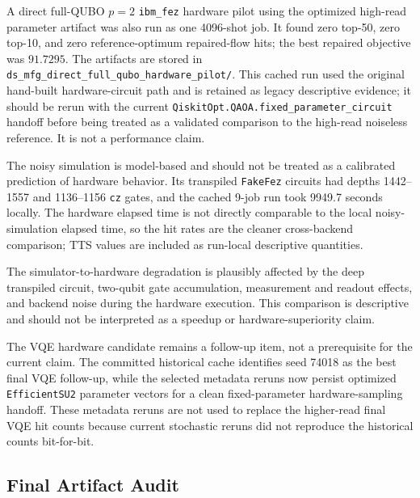 A direct full-QUBO $p=2$ \texttt{ibm\_fez} hardware pilot using the optimized
high-read parameter artifact was also run as one 4096-shot job. It found zero
top-50, zero top-10, and zero reference-optimum repaired-flow hits; the best repaired
objective was $91.7295$. The artifacts are stored in
\texttt{ds\_mfg\_direct\_full\_qubo\_hardware\_pilot/}. This cached run used
the original hand-built hardware-circuit path and is retained as legacy
descriptive evidence; it should be rerun with the current
\texttt{QiskitOpt.QAOA.fixed\_parameter\_circuit} handoff before being treated
as a validated comparison to the high-read noiseless reference. It is not a
performance claim.

The noisy simulation is model-based and should not be treated as a calibrated
prediction of hardware behavior. Its transpiled \texttt{FakeFez} circuits had
depths 1442--1557 and 1136--1156 \texttt{cz} gates, and the cached 9-job run
took 9949.7 seconds locally. The hardware elapsed time is not directly
comparable to the local noisy-simulation elapsed time, so the hit rates are the
cleaner cross-backend comparison; TTS values are included as run-local
descriptive quantities.

The simulator-to-hardware degradation is plausibly affected by the deep
transpiled circuit, two-qubit gate accumulation, measurement and readout
effects, and backend noise during the hardware execution. This comparison is
descriptive and should not be interpreted as a speedup or hardware-superiority
claim.

The VQE hardware candidate remains a follow-up item, not a prerequisite for the
current claim. The committed historical cache identifies seed 74018 as the best
final VQE follow-up, while the selected metadata reruns now persist optimized
\texttt{EfficientSU2} parameter vectors for a clean fixed-parameter
hardware-sampling handoff. These metadata reruns are not used to replace the
higher-read final VQE hit counts because current stochastic reruns did not
reproduce the historical counts bit-for-bit.

\subsection{Final Artifact Audit}
\label{subsec:ds-mfg-final-artifact-audit}

